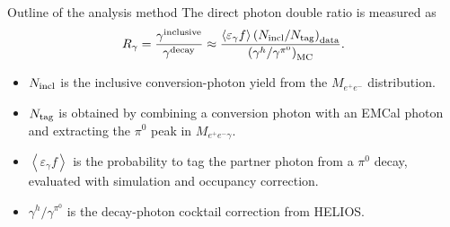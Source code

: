 \documentclass[10pt, dvipsnames]{beamer}
\begin{document}
\begin{frame}{Outline of the analysis method}
   \small
   The direct photon double ratio is measured as
   \begin{equation*}
      R_\gamma = \frac{\gamma^{\rm inclusive}}{\gamma^{\rm decay}}
      \approx
      \frac{
      \left\langle\varepsilon_\gamma f\right\rangle
      \left(N_{\rm incl}/N_{\rm tag}\right)_{\rm data}
      }{
      \left(\gamma^{h}/\gamma^{\pi^0}\right)_{\rm MC}
      } .
   \end{equation*}
   \begin{itemize}
      \item $N_{\rm incl}$ is the inclusive conversion-photon yield from the $M_{e^+e^-}$ distribution.
      \item $N_{\rm tag}$ is obtained by combining a conversion photon with an EMCal photon and extracting the $\pi^0$ peak in $M_{e^+e^-\gamma}$.
      \item $\left\langle\varepsilon_\gamma f\right\rangle$ is the probability to tag the partner photon from a $\pi^0$ decay, evaluated with simulation and occupancy correction.
      \item $\gamma^h/\gamma^{\pi^0}$ is the decay-photon cocktail correction from HELIOS.
   \end{itemize}
\end{frame}
\end{document}
